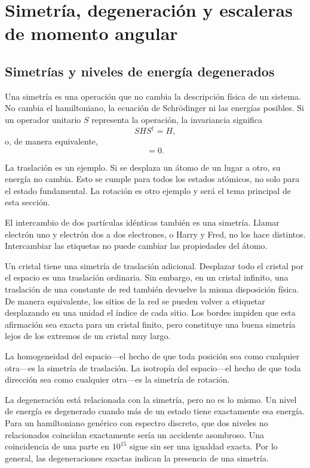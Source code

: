 \chapter{Simetría, degeneración y escaleras de momento angular}
\providecommand{\ket}[1]{\left\lvert#1\right\rangle}

\section{Simetrías y niveles de energía degenerados}

Una simetría es una operación que no cambia la descripción física de un sistema. No cambia el hamiltoniano, la ecuación de Schr\"odinger ni las energías posibles. Si un operador unitario \(S\) representa la operación, la invariancia significa
\begin{equation}
S H S^\dagger=H,
\end{equation}
o, de manera equivalente,
\begin{equation}
[S,H]=0.
\end{equation}

La traslación es un ejemplo. Si se desplaza un átomo de un lugar a otro, su energía no cambia. Esto se cumple para todos los estados atómicos, no solo para el estado fundamental. La rotación es otro ejemplo y será el tema principal de esta sección.

El intercambio de dos partículas idénticas también es una simetría. Llamar electrón uno y electrón dos a dos electrones, o Harry y Fred, no los hace distintos. Intercambiar las etiquetas no puede cambiar las propiedades del átomo.

Un cristal tiene una simetría de traslación adicional. Desplazar todo el cristal por el espacio es una traslación ordinaria. Sin embargo, en un cristal infinito, una traslación de una constante de red también devuelve la misma disposición física. De manera equivalente, los sitios de la red se pueden volver a etiquetar desplazando en una unidad el índice de cada sitio. Los bordes impiden que esta afirmación sea exacta para un cristal finito, pero constituye una buena simetría lejos de los extremos de un cristal muy largo.

La homogeneidad del espacio---el hecho de que toda posición sea como cualquier otra---es la simetría de traslación. La isotropía del espacio---el hecho de que toda dirección sea como cualquier otra---es la simetría de rotación.

La degeneración está relacionada con la simetría, pero no es lo mismo. Un nivel de energía es degenerado cuando más de un estado tiene exactamente esa energía. Para un hamiltoniano genérico con espectro discreto, que dos niveles no relacionados coincidan exactamente sería un accidente asombroso. Una coincidencia de una parte en \(10^{15}\) sigue sin ser una igualdad exacta. Por lo general, las degeneraciones exactas indican la presencia de una simetría.

